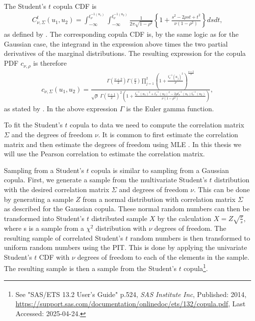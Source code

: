 \documentclass[%
a4paper,							
11pt,								
bibliography=totoc,						
abstracton=true					
]
{scrartcl}
\theoremstyle{plain}
\theoremstyle{definition}
\theoremstyle{remark}
\newcommand{\1}{\mathbbm{1}}
\begin{document}
The Student's $t$ copula \gls{CDF} is 
\begin{align*}
     C_{\nu,\Sigma}^t (u_1,u_2)
    = \int_{-\infty}^{t_\nu^{-1(u_1)}}\int_{-\infty}^{t_\nu^{-1(u_2)}}
    \frac{1}{2\pi\sqrt{1-\rho^2}} \left\{  1+ \frac{s^2-2\rho st+t^2}{\nu(1-\rho^2)}   \right\} dsdt,
\end{align*}
as defined by \citet[p.~116]{Umberto2004copulaMethods}. The corresponding copula \gls{CDF} is, by the same logic as for the Gaussian case, the integrand in the expression above times the two partial derivatives of the marginal distributions. The resulting expression for the copula \gls{PDF} $c_{\nu,\rho}$ is therefore 
\begin{align*}
    c_{\nu,\Sigma}(u_1,u_2) = \frac{\Gamma(\frac{\nu+2}{2})\Gamma(\frac{\nu}{2})\prod_{j=1}^2\left( 1+ \frac{t_\nu^{-1}(u_j)^2}{\nu}\right)^{\frac{\nu+2}{2}} } {\sqrt{\rho} \;\Gamma(\frac{\nu+1}{2})^{2}\left( 1+ \frac{t_\nu^{-1}(u_1)^2 + t_\nu^{-1}(u_2)^2 -2\rho t_\nu^{-1}(u_1) t_\nu^{-1}(u_2) }{\nu(1-\rho^2)}\right)},
\end{align*}
as stated by . In the above expression $\Gamma$ is the Euler gamma function.

To fit the Student's $t$ copula to data we need to compute the correlation matrix $\Sigma$ and the degrees of freedom $\nu$. It is common to first estimate the correlation matrix and then estimate the degrees of freedom using \gls{MLE} . In this thesis we will use the Pearson correlation to estimate the correlation matrix. 

Sampling from a Student's $t$ copula is similar to sampling from a Gaussian copula. First, we generate a sample from the multivariate Student's $t$ distribution with the desired correlation matrix $\Sigma$ and degrees of freedom $\nu$. This can be done by generating a sample $Z$ from a normal distribution with correlation matrix $\Sigma$ as described for the Gaussian copula. These normal random numbers can then be transformed into Student's $t$ distributed sample $X$ by the calculation $X = Z\sqrt{\frac{\nu}{s}} $, where s is a sample from a $\chi^2$ distribution with $\nu$ degrees of freedom. The resulting sample of correlated Student's $t$ random numbers is then transformed to uniform random numbers using the \gls{PIT}. This is done by applying the univariate Student's $t$ \gls{CDF} with $\nu$ degrees of freedom to each of the elements in the sample. The resulting sample is then a sample from the Student's $t$ copula\footnote{See "SAS/ETS\textsuperscript{\textregistered} 13.2 User's Guide" p.524, \textit{SAS Institute Inc}, Published: 2014, \url{https://support.sas.com/documentation/onlinedoc/ets/132/copula.pdf}, Last Accessed: 2025-04-24.}.
\end{document}
